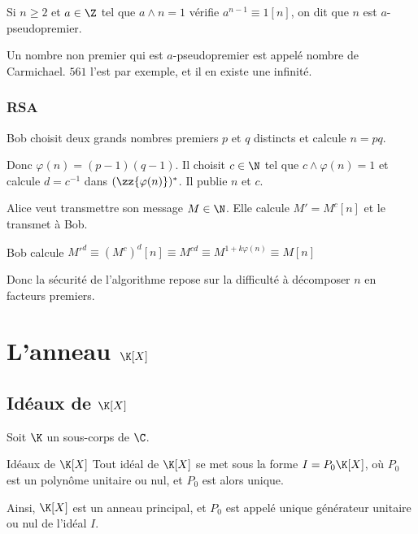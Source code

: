 Si $n \geqslant 2$ et $a \in \Z$ tel que $a \wedge n = 1$ vérifie $a^{n -1} \equiv 1 [n]$,
on dit que $n$ est $a$-pseudopremier.

Un nombre non premier qui est $a$-pseudopremier est appelé nombre de Carmichael. 
$561$ l'est par exemple, et il en existe une infinité. 

\subsubsection{RSA}

Bob choisit deux grands nombres premiers $p$ et $q$ distincts et calcule $n = pq$. 

Donc $\varphi(n) = (p- 1)(q-1)$. Il choisit $c \in \N$ tel que $c \wedge \varphi(n) = 1$ et 
calcule $d = c^{-1}$ dans $(\zz {\varphi(n)})^*$. Il publie $n$ et $c$. 

Alice veut transmettre son message $M \in \N$. Elle calcule $M' = M^c [n]$ et le transmet à Bob.

Bob calcule $M'^d \equiv (M^c)^d [n] \equiv M^{cd} \equiv M^{1 + k \varphi(n)} \equiv M[n]$

Donc la sécurité de l'algorithme repose sur la difficulté à décomposer $n$ en facteurs premiers. 

\section{L'anneau \texorpdfstring{$\K [X]$}{K[X]}}
\subsection{Idéaux de \texorpdfstring{$\K [X]$}{K[X]}}

Soit $\K$ un sous-corps de $\C$.

\begin{theoreme}{Idéaux de $\K[X]$}{}
    Tout idéal de $\K[X]$ se met sous la forme $I = P_0 \K[X]$, où $P_0$ est un polynôme
    unitaire ou nul, et $P_0$ est alors unique.

    Ainsi, $\K[X]$ est un anneau principal, et $P_0$ est appelé unique générateur unitaire 
    ou nul de l'idéal $I$.
\end{theoreme}


